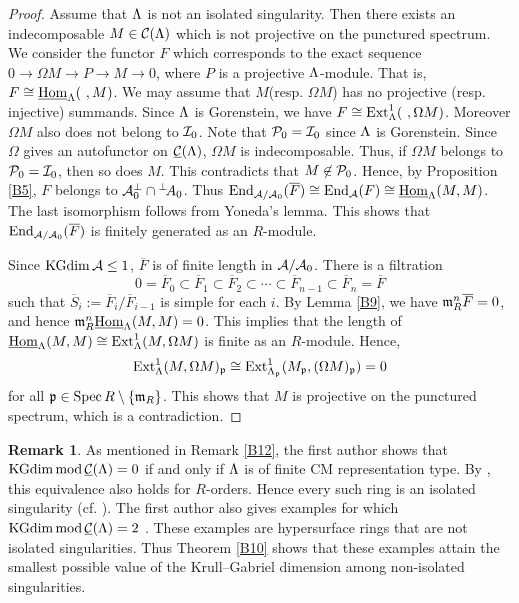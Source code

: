 \documentclass[11pt]{amsart}
\theoremstyle{definition}
\newtheorem{remark}[theorem]{Remark}
\numberwithin{equation}{section}
\begin{document}
\begin{proof}
Assume that $\LL$ is not an isolated singularity. 
Then there exists an indecomposable $M \in \CML$ which is not projective on the punctured spectrum.  
We consider the functor $F$ which corresponds to the exact sequence $0 \to \Omega M \to P \to M \to 0$, where $P$ is a projective $\LL$-module. 
That is, $F \cong \sHomL (\ ,  M)$. 
We may assume that $M$(resp. $\Omega M$) has no projective (resp. injective) summands. 
Since $\LL$ is Gorenstein, we have $F  \cong  \Ext ^1 _\LL (\ ,  \Omega M)$. 
Moreover $\Omega M$ also does not belong to $\II_0$. 
Note that $\PP_0 = \II_0$ since $\LL$ is Gorenstein. 
Since $\Omega$ gives an autofunctor on $\sCML$, $\Omega M$ is indecomposable. 
Thus, if $\Omega M$ belongs to $\PP_0 = \II_0$, then so does $M$. 
This contradicts that $M \not\in \PP_0$. 
Hence, by Proposition \ref{B5}, $F$ belongs to $\AA_0 ^{\perp} \cap {}^{\perp}\! A_0$. 
Thus $\End _{\AA / \AA_0} (\overline{F}) \cong \End_\AA (F) \cong \sHomL (M, M)$. 
The last isomorphism follows from Yoneda's lemma. 
This shows that  $\End _{\AA / \AA_0} (\overline{F})$ is finitely generated as an $R$-module. 

Since $\KGdim \AA \le 1$, $\overline{F}$ is of finite length in $\AA / \AA_0$. 
There is a filtration
$$
0 = \overline{F}_0 \subset \overline{F}_1 \subset \overline{F}_2 \subset \cdots \subset \overline{F}_{n-1} \subset \overline{F}_n= \overline{F} 
$$
such that $\overline{S}_i := \overline{F}_i/\overline{F}_{i-1}$ is simple for each $i$. 
By Lemma \ref{B9}, we have $\m_R ^n \overline{F}=0$, and hence $\m_R ^n \sHomL (M, M) =0$. 
This implies that the length of $\sHomL (M, M)\cong \Ext ^1 _\LL (M, \Omega M)$ is finite as an $R$-module.
Hence, $$\Ext ^1 _\LL (M, \Omega M)_\p \cong \Ext ^1 _{\LL_\p} (M_\p, (\Omega M )_\p) =0$$ for all $\p \in \Spec R \setminus \{\m_R \}$. 
This shows that $M$ is projective on the punctured spectrum, which is a contradiction.
\end{proof}


\begin{remark}\label{B11}
As mentioned in Remark \ref{B12}, the first author shows that $\KGdim \modsCML=0$ if and only if $\LL$ is of finite CM representation type. 
By \cite[Proposition 3.3]{E19}, this equivalence also holds for $R$-orders. 
Hence every such ring is an isolated singularity (cf. \cite[2.2]{Y}). 
The first author also gives examples for which $\KGdim \modsCML=2$ \cite{H24}. 
These examples are hypersurface rings that are not isolated singularities. 
Thus Theorem \ref{B10} shows that these examples attain the smallest possible value of the Krull--Gabriel dimension among non-isolated singularities.
\end{remark}
\end{document}
